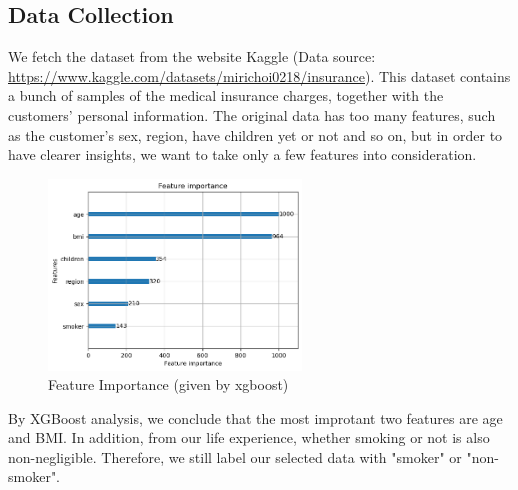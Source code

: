 \documentclass[12pt,a4paper]{article}
\begin{document}
\subsection{Data Collection}
We fetch the dataset from the website Kaggle (Data source: \url{https://www.kaggle.com/datasets/mirichoi0218/insurance}). This dataset contains a bunch of samples of the medical insurance charges, together with the customers' personal information. The original data has too many features, such as the customer's sex, region, have children yet or not and so on, but in order to have clearer insights, we want to take only a few features into consideration. 
\begin{figure}[H]
\centering
\includegraphics[width = 0.6\textwidth]{feature_importance.png}
\caption{Feature Importance (given by xgboost)}
\end{figure}
\par By XGBoost analysis, we conclude that the most improtant two features are age and BMI. In addition, from our life experience, whether smoking or not is also non-negligible.  Therefore, we still label our selected data with "smoker" or "non-smoker".
\end{document}
